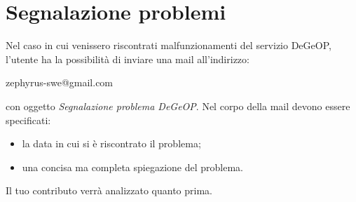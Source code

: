 \section{Segnalazione problemi}
Nel caso in cui venissero riscontrati malfunzionamenti del servizio DeGeOP, l'utente ha la possibilità di inviare una mail all'indirizzo:
\begin{center}
	zephyrus-swe@gmail.com
\end{center}
con oggetto \textit{Segnalazione problema DeGeOP}.
Nel corpo della mail devono essere specificati:
	\begin{itemize}
		\item la data in cui si è riscontrato il problema;
		\item una concisa ma completa spiegazione del problema.
	\end{itemize}
Il tuo contributo verrà analizzato quanto prima.